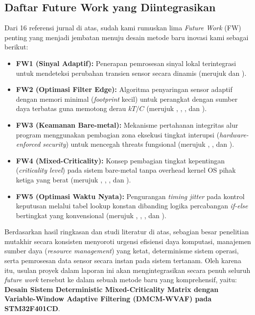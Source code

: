 \documentclass[11pt,a4paper]{article}
\begin{document}
\begin{longtable}
\subsection{Daftar Future Work yang Diintegrasikan}
\hspace{1.5em}Dari 16 referensi jurnal di atas, sudah kami rumuskan lima \textit{Future Work} (FW) penting yang menjadi jembatan menuju desain metode baru inovasi kami sebagai berikut:
\begin{itemize}
    \item \textbf{FW1 (Sinyal Adaptif):} Penerapan pemrosesan sinyal lokal terintegrasi untuk mendeteksi perubahan transien sensor secara dinamis (merujuk \cite{vrbancic2024} dan \cite{pop2022}).
    \item \textbf{FW2 (Optimasi Filter Edge):} Algoritma penyaringan sensor adaptif dengan memori minimal (\textit{footprint} kecil) untuk perangkat dengan sumber daya terbatas guna memotong derau $kT/C$ (merujuk \cite{teslyuk2023}, \cite{diab2022}, \cite{tang2022}, dan \cite{lee2024}).
    \item \textbf{FW3 (Keamanan Bare-metal):} Mekanisme pertahanan integritas alur program menggunakan pembagian zona eksekusi tingkat interupsi (\textit{hardware-enforced security}) untuk mencegah threats fungsional (merujuk \cite{guan2021}, \cite{gupta2025}, dan \cite{anshul2024}).
    \item \textbf{FW4 (Mixed-Criticality):} Konsep pembagian tingkat kepentingan (\textit{criticality level}) pada sistem bare-metal tanpa overhead kernel OS pihak ketiga yang berat (merujuk \cite{wang2024}, \cite{hubacz2023}, \cite{lozano2023}, dan \cite{lee2024}).
    \item \textbf{FW5 (Optimasi Waktu Nyata):} Pengurangan \textit{timing jitter} pada kontrol keputusan melalui tabel lookup konstan dibanding logika percabangan \textit{if-else} bertingkat yang konvensional (merujuk \cite{plauska2023}, \cite{audrito2023}, \cite{jacko2022}, dan \cite{gupta2025}).
\end{itemize}
\hspace{1.5em}Berdasarkan hasil ringkasan dan studi literatur di atas, sebagian besar penelitian mutakhir secara konsisten menyoroti urgensi efisiensi daya komputasi, manajemen sumber daya (\textit{resource management}) yang ketat, determinisme sistem operasi, serta pemrosesan data sensor secara instan pada sistem tertanam. Oleh karena itu, usulan proyek dalam laporan ini akan mengintegrasikan secara penuh seluruh \textit{future work} tersebut ke dalam sebuah metode baru yang komprehensif, yaitu: \textbf{Desain Sistem Deterministic Mixed-Criticality Matrix dengan Variable-Window Adaptive Filtering (DMCM-WVAF) pada STM32F401CD}.


\end{longtable}
\end{document}
